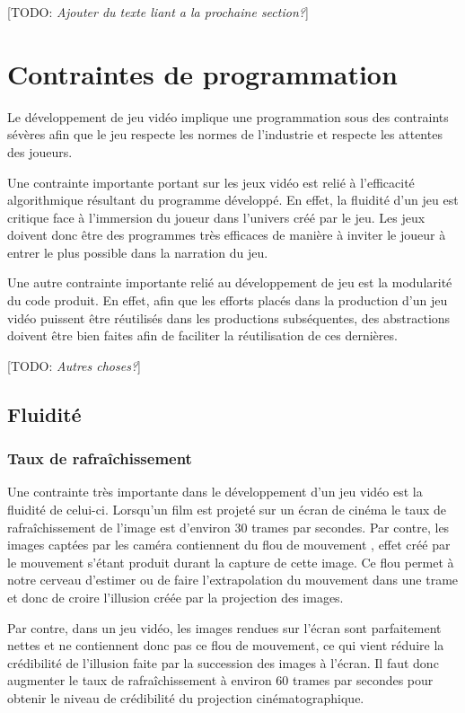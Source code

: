 \documentclass[12pt,oneside,letterpaper,francais]{book}
\newcommand{\todo}[1]{[TODO: {\it #1}]}
\begin{document}
\todo{Ajouter du texte liant a la prochaine section?}



\section{Contraintes de programmation}

Le développement de jeu vidéo implique une programmation sous des
contraints sévères afin que le jeu respecte les normes de l'industrie
et respecte les attentes des joueurs.

Une contrainte importante portant sur les jeux vidéo est relié à
l'efficacité algorithmique résultant du programme développé. En effet,
la fluidité d'un jeu est critique face à l'immersion du joueur dans
l'univers créé par le jeu. Les jeux doivent donc être des programmes
très efficaces de manière à inviter le joueur à entrer le plus
possible dans la narration du jeu.

Une autre contrainte importante relié au développement de jeu est la
modularité du code produit. En effet, afin que les efforts placés dans
la production d'un jeu vidéo puissent être réutilisés dans les
productions subséquentes, des abstractions doivent être bien faites
afin de faciliter la réutilisation de ces dernières.

\todo{Autres choses?}

\subsection{Fluidité}


\subsubsection{Taux de rafraîchissement}
Une contrainte très importante dans le développement d'un jeu vidéo
est la fluidité de celui-ci. Lorsqu'un film est projeté sur un écran
de cinéma le taux de rafraîchissement de l'image est d'environ 30
trames par secondes. Par contre, les images captées par les caméra
contiennent du \og flou de mouvement \fg, effet créé par le mouvement
s'étant produit durant la capture de cette image. Ce flou permet à
notre cerveau d'estimer ou de faire l'extrapolation du mouvement dans
une trame et donc de croire l'illusion créée par la projection des
images.

Par contre, dans un jeu vidéo, les images rendues sur l'écran sont
parfaitement nettes et ne contiennent donc pas ce flou de mouvement,
ce qui vient réduire la crédibilité de l'illusion faite par la
succession des images à l'écran. Il faut donc augmenter le taux de
rafraîchissement à environ 60 trames par secondes pour obtenir le
niveau de crédibilité du projection cinématographique.
\end{document}
